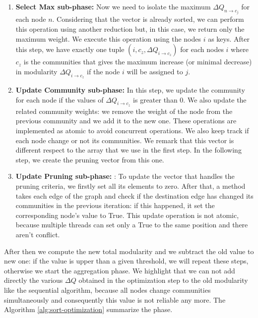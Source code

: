\begin{enumerate}
	\item \textbf{Select Max sub-phase:} Now we need to isolate the maximum $\Delta Q_{n\rightarrow c_j}$ for each node $n$. Considering that the vector is already sorted, we can perform this operation using another reduction but, in this case, we return only the maximum weight. We execute this operation using the nodes $i$ as keys.  After this step, we have exactly one tuple  $(i, c_z, \Delta Q_{i\rightarrow c_z})$  for each nodes $i$ where $c_z$ is the communities that gives the maximum increase (or minimal decrease) in modularity $\Delta Q_{i\rightarrow c_z}$ if the node $i$ will be assigned to $j$.
	
	\item \textbf{Update Community sub-phase:}\label{update_com} In this step, we update the community for each node if the values of $\Delta Q_{i\rightarrow c_z}$ is greater than 0. We also update the related community weights: we remove the weight of the node from the previous community and we add it to the new one. These operations are implemented as atomic to avoid concurrent operations.  We also keep track if each node change or not its communities. We remark that this
	vector is different respect to the array that we use in the first step. In the following step, we create the pruning vector from this one.

	
	\item \textbf{Update Pruning sub-phase:}\label{update_prun} : To update the vector that handles the pruning
	criteria, we firstly set all its elements to zero. After that, a method takes each
	edge of the graph and check if the destination edge has changed its communities
	in the previous iteration: if this happened, it set the corresponding node’s value
	to True. This update operation is not atomic, because multiple threads can
	set only a True to the same position and there aren’t conflict.

\end{enumerate}
After then we compute the new total modularity and we subtract the old value to new one: if the value is upper than a given threshold, we will repeat these steps, otherwise we start the aggregation phase. We highlight that we can not add directly the various $\Delta Q$ obtained in the optimization step to the old modularity
like the sequential algorithm, because all nodes change communities simultaneously and consequently this value is not reliable any more.
The Algorithm \ref{alg:sort-optimization} summarize the phase.
